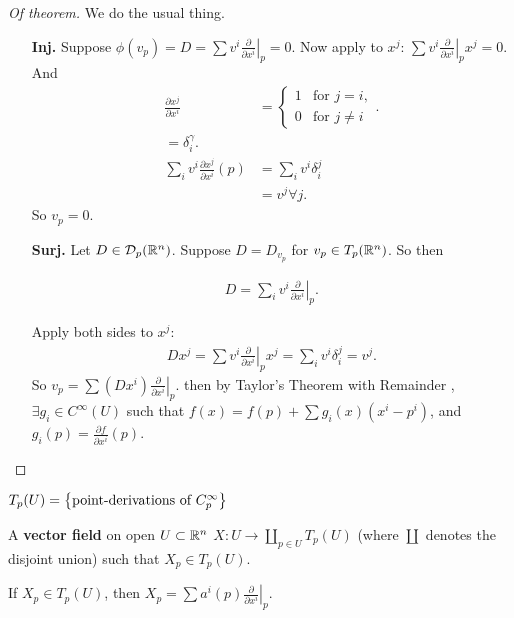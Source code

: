 \documentclass[12pt, twosided]{article}
\begin{document}
\begin{proof}[Of theorem] We do the usual thing.
  \begin{enumerate}
  \item[\textbf{Inj.}] Suppose \(\phi(v_p) = D = \sum v^i \left.\frac{\partial}{\partial x^i}\right\vert_p = 0\).
    Now apply to \(x^j\): \(\sum v^i \left.\frac{\partial}{\partial x^i}\right\vert_p x^j = 0\).
    And
    \begin{align*}
      \frac{\partial x^j}{\partial x^i} &=
      \begin{cases}
        1 & \text{for } j = i, \\
        0 & \text{for } j \neq i
      \end{cases}. \\
      = \delta_i^{\gamma}. \\
      \sum_i v^i \frac{\partial x^j}{\partial x^i}(p) &= \sum_i v^i \delta_i^j \\ &= v^j \forall j.
    \end{align*}
    So \(v_p = 0\).
  \item [\textbf{Surj.}] Let \(D \in \mathcal{D}_p(\mathbb{R}^n)\). Suppose \(D = D_{v_p}\) for \(v_p \in T_p(\mathbb{R}^n)\). So then

    \begin{align*}
      D = \sum_i v^i \left.\frac{\partial}{\partial x^i}\right\vert_p.
    \end{align*}

    Apply both sides to \(x^j\):
    \begin{align*}
      Dx^j = \sum v^i \left.\frac{\partial}{\partial x^i}\right\vert_p x^j = \sum_i v^i \delta^j_i = v^j.
    \end{align*}
    So \(v_p = \sum (Dx^i)\left.\frac{\partial}{\partial x^i}\right\vert_p\). then by Taylor's Theorem with Remainder , \(\exists g_i \in C^\infty(U)\) such that \(f(x) = f(p) + \sum g_i(x) (x^i - p^i)\), and \(g_i(p) = \frac{\partial f}{\partial x^i}(p)\).
  \end{enumerate}
\end{proof}

\begin{df}
  \(T_p(U) = \left\{ \text{point-derivations of } C_p^\infty\right\}\)
\end{df}

\begin{df}
  A \textbf{vector field} on open \(U \subset \mathbb{R}^n\) \(X: U \to \coprod_{p \in U}T_p(U)\) (where \(\coprod\) denotes the disjoint union) such that \(X_p \in T_p(U)\).
\end{df}
\begin{note}
  If \(X_p \in T_p(U)\), then \(X_p = \sum a^i(p)\left.\frac{\partial}{\partial x^i}\right\vert_p\).
\end{note}
\end{document}
